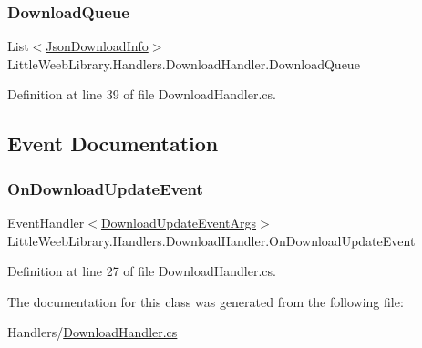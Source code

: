 \subsubsection{\texorpdfstring{Download\+Queue}{DownloadQueue}}
{\footnotesize\ttfamily List$<$\mbox{\hyperlink{class_little_weeb_library_1_1_models_1_1_json_download_info}{Json\+Download\+Info}}$>$ Little\+Weeb\+Library.\+Handlers.\+Download\+Handler.\+Download\+Queue\hspace{0.3cm}{\ttfamily [private]}}



Definition at line 39 of file Download\+Handler.\+cs.



\subsection{Event Documentation}
\mbox{\label{class_little_weeb_library_1_1_handlers_1_1_download_handler_a639d0d2adc924c6252b3cc5756ea9281}} 
\subsubsection{\texorpdfstring{On\+Download\+Update\+Event}{OnDownloadUpdateEvent}}
{\footnotesize\ttfamily Event\+Handler$<$\mbox{\hyperlink{class_little_weeb_library_1_1_event_arguments_1_1_download_update_event_args}{Download\+Update\+Event\+Args}}$>$ Little\+Weeb\+Library.\+Handlers.\+Download\+Handler.\+On\+Download\+Update\+Event}



Definition at line 27 of file Download\+Handler.\+cs.



The documentation for this class was generated from the following file\+:\begin{DoxyCompactItemize}
\item 
Handlers/\mbox{\hyperlink{_download_handler_8cs}{Download\+Handler.\+cs}}\end{DoxyCompactItemize}
